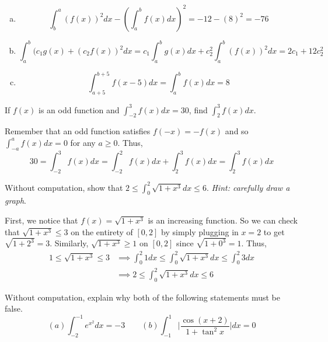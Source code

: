 \documentclass[11pt]{exam}
\begin{document}
\begin{questions}
    \begin{solution}
      \begin{enumerate}[(a)]
      \item \[
          \int_b^a (f(x))^2 dx - \left(\int_a^b f(x) dx\right)^2 = -12-(8)^2 = -76
        \] 
      \item \[
          \int_a^b (c_1 g(x) +(c_2f(x))^2 dx = c_1 \int_a^b g(x) dx +
          c_2^2 \int_a^b (f(x))^2 dx = 2 c_1 + 12 c_2^2
        \]
      \item \[
          \int_{a+5}^{b+5} f(x-5) dx = \int_a^b f(x) dx = 8
        \]
      \end{enumerate}
    \end{solution}
  \question If $f(x)$ is an odd function and $\int_{-2}^3 f(x) dx = 30$, find $\int_2^3 f(x) dx$.
    \begin{solution}
      Remember that an odd function satisfies \(f(-x) =
      -f(x)\) and so \(\int_{-a}^a f(x) dx = 0\) for any \(a \geq 0\). Thus, \[
        30 = \int_{-2}^3 f(x) dx = \int_{-2}^2 f(x) dx + \int_2^3 f(x)
        dx = \int_2^3 f(x) dx
      \]
    \end{solution}
  \question Without computation, show that $2 \leq \int_0^2
    \sqrt{1+x^3} dx \leq 6$.  \textit{Hint: carefully draw a graph}. 
    \begin{solution}
      First, we notice that \(f(x) = \sqrt{1+x^3}\) is an increasing function.
      So we can check that \(\sqrt{1+x^3} \leq 3\) on the entirety of
      \([0,2]\) by simply plugging in \(x=2\) to get \(\sqrt{1+2^3} =
      3\). Similarly, \(\sqrt{1+x^3} 
      \geq 1\) on \([0,2]\) since \(\sqrt{1+0^3} = 1\). Thus,
      \begin{align*}
        1 \leq \sqrt{1+x^3} \leq 3
        & \implies \int_0^2 1 dx \leq \int_0^2 \sqrt{1+x^3} dx \leq
          \int_0^2 3 dx \\
        & \implies 2 \leq \int_0^2 \sqrt{1+x^3} dx \leq 6
      \end{align*}
    \end{solution}
  \question Without computation, explain why both of the following statements must be false.
 $$(a) \int_{-2}^{-1} e^{x^2} dx = -3  \quad \quad (b) \int_{-1}^1 \bigg|  \frac{\cos(x+2)}{1+\tan^2 x}\bigg| dx = 0$$
 \begin{solution}

\end{solution}
\end{questions}
\end{document}
